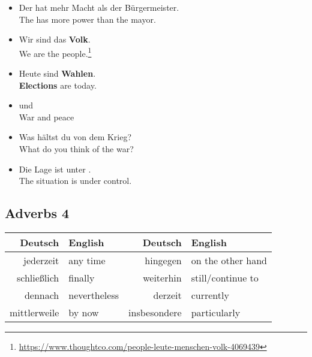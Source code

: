 \begin{itemize}
  \item  Der  hat mehr Macht als der B{\"u}rgermeister. \\
  The  has more power than the mayor.
  \item  Wir sind das \textbf{Volk}. \\
  We are the people.\footnote{\url{https://www.thoughtco.com/people-leute-menschen-volk-4069439}}
  \item  Heute sind \textbf{Wahlen}. \\
  \textbf{Elections} are today.
  \item  {} und  \\
  War and peace
  \item  Was h{\"a}ltst du von dem Krieg? \\
  What do you think of the war?
  \item  Die Lage ist unter . \\
  The situation is under control.
\end{itemize}


\pagebreak
\subsection{Adverbs 4}

\begin{center}\begin{tabular}{r|l||r|l}
  \textbf{Deutsch} & \textbf{English} & \textbf{Deutsch} & \textbf{English} \\
	\hline
	jederzeit & any time & hingegen & on the other hand \\
	schlie{\ss}lich & finally & weiterhin & still/continue to \\
	dennach & nevertheless & derzeit & currently \\
	mittlerweile & by now & insbesondere & particularly \\
\end{tabular}\end{center}

